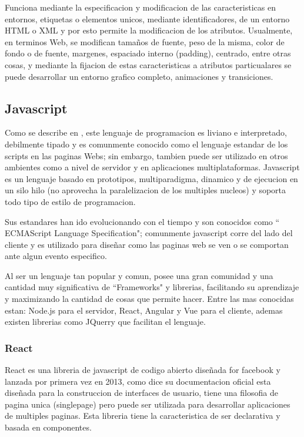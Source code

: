 Funciona mediante la especificacion y modificacion de las caracteristicas en
entornos, etiquetas o elementos unicos, mediante identificadores, de un entorno
HTML o XML y por esto permite la modificacion de los atributos.
Usualmente, en terminos Web, se modifican tamaños de fuente, peso de la misma,
color de fondo o de fuente, margenes, espaciado interno (padding), centrado,
entre otras cosas, y mediante la fijacion de estas caracteristicas a atributos
particualares se puede desarrollar un entorno grafico completo, animaciones y
transiciones.

\subsection{Javascript}

Como se describe en \cite{JavaScript}, este lenguaje de programacion es liviano e
interpretado, debilmente tipado y es comunmente conocido como el lenguaje estandar
de los scripts en las paginas Webs; sin embargo, tambien puede ser utilizado en
otros ambientes como a nivel de servidor y en aplicaciones multiplataformas.
Javascript es un lenguaje basado en prototipos, multiparadigma, dinamico y de
ejecucion en un silo hilo (no aprovecha la paralelizacion de los multiples
nucleos) y soporta todo tipo de estilo de programacion.

Sus estandares han ido evolucionando con el tiempo y son conocidos como
`` ECMAScript Language Specification"; comunmente javascript corre del lado del
cliente y es utilizado para diseñar como las paginas web se ven o se comportan
ante algun evento especifico.

Al ser un lenguaje tan popular y comun, posee una gran comunidad y una cantidad
muy significativa de ``Frameworks"  y librerias, facilitando su aprendizaje
y maximizando la cantidad de cosas que permite hacer. Entre las mas conocidas
estan: Node.js para el servidor, React, Angular y Vue para el cliente, ademas
existen librerias como JQuerry que facilitan el lenguaje.

\subsubsection{React}

React es una libreria de javascript de codigo abierto diseñada for facebook y
lanzada por primera vez en 2013, como dice su documentacion oficial \cite{React}
esta diseñada para la construccion de interfaces de usuario, tiene una filosofia
de pagina unica (singlepage) pero puede ser utilizada para desarrollar aplicaciones
de multiples paginas. Esta libreria tiene la caracteristica de ser declarativa
y basada en componentes.

